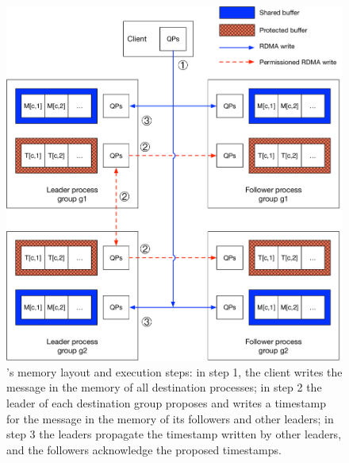 \begin{figure}[ht!]
  \centering
  \includegraphics[width=1\linewidth]{figures/architecture2}
  \caption{\libname's memory layout and execution steps: in step 1, the client writes the message in the memory of all destination processes; in step 2 the leader of each destination group proposes and writes a timestamp for the message in the memory of its followers and other leaders; in step 3 the leaders propagate the timestamp written by other leaders, and the followers acknowledge the proposed timestamps.}
  \label{fig:arch}
\end{figure}


